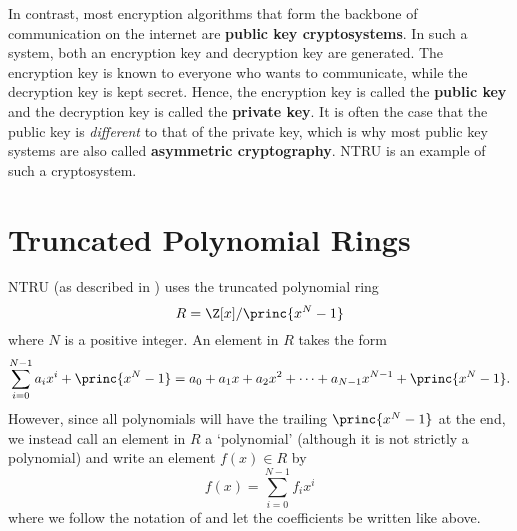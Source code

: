 In contrast, most encryption algorithms that form the backbone of communication on the internet are \textbf{public key cryptosystems}. In such a system, both an encryption key and decryption key are generated. The encryption key is known to everyone who wants to communicate, while the decryption key is kept secret. Hence, the encryption key is called the \textbf{public key} and the decryption key is called the \textbf{private key}. It is often the case that the public key is \textit{different} to that of the private key, which is why most public key systems are also called \textbf{asymmetric cryptography}. NTRU is an example of such a cryptosystem.

\section{Truncated Polynomial Rings}
NTRU (as described in \cite{hoffstein_pipher_silverman_1998}) uses the truncated polynomial ring
\[
    R = \Z[x] / \princ{x^N - 1}
\]
where $N$ is a positive integer. An element in $R$ takes the form
\[
    \sum_{i=0}^{N-1}a_ix^i + \princ{x^N - 1} = a_0 + a_1x + a_2x^2 + \cdots + a_{N-1}x^{N-1} + \princ{x^N - 1}.
\]
However, since all polynomials will have the trailing $\princ{x^N - 1}$ at the end, we instead call an element in $R$ a `polynomial' (although it is not strictly a polynomial) and write an element $f(x) \in R$ by
\[
    f(x) = \sum_{i=0}^{N-1}f_ix^i
\]
where we follow the notation of \cite{hoffstein_pipher_silverman_1996,hoffstein_pipher_silverman_1998} and let the coefficients be written like above.

